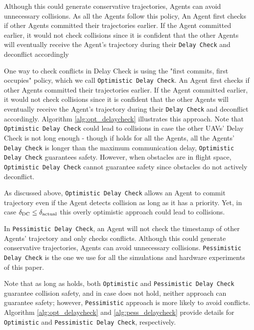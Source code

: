     Although this could generate conservative trajectories, Agents can avoid unnecessary collisions.
        As all the Agents follow this policy,  An Agent first checks if other Agents committed their trajectories earlier. If the Agent committed earlier, it would not check collisions since it is confident that the other Agents will eventually receive the Agent's trajectory during their {\tt Delay Check} and deconflict accordingly

One way to check conflicts in Delay Check is using the "first commits, first occupies" policy, which we call {\tt Optimistic Delay Check}. An Agent first checks if other Agents committed their trajectories earlier. If the Agent committed earlier, it would not check collisions since it is confident that the other Agents will eventually receive the Agent's trajectory during their {\tt Delay Check} and deconflict accordingly. 
Algorithm \ref{alg:opt_delaycheck} illustrates this approach. Note that {\tt Optimistic Delay Check} could lead to collisions in case the other UAVs' Delay Check is not long enough - though if \NeccessaryCond{} holds for all the Agents, 
all the Agents' {\tt Delay Check} is longer than the maximum communication delay, 
{\tt Optimistic Delay Check} guarantees safety. 
However, when obstacles are in flight space, {\tt Optimistic Delay Check} cannot guarantee safety since obstacles do not actively deconflict. 

As discussed above, {\tt Optimistic Delay Check} allows an Agent to commit trajectory even if the Agent detects collision as long as it has a priority. Yet, in case $\delta_\text{DC}\le\delta_\text{actual}$ this overly optimistic approach could lead to collisions.

In {\tt Pessimistic Delay Check}, an Agent will not check the timestamp of other Agents' trajectory and only checks conflicts. Although this could generate conservative trajectories, Agents can avoid unnecessary collisions. {\tt Pessimistic Delay Check} is the one we use for all the simulations and hardware experiments of this paper.

Note that as long as \NeccessaryCond{} holds, both {\tt Optimistic} and {\tt Pessimistic Delay Check} guarantee collision safety, and in case \NeccessaryCond{} does not hold, neither approach can guarantee safety; however, {\tt Pessimistic} approach is more likely to avoid conflicts. Algorithm \ref{alg:opt_delaycheck} and \ref{alg:pess_delaycheck} provide details for {\tt Optimistic} and {\tt Pessimistic Delay Check}, respectively.


